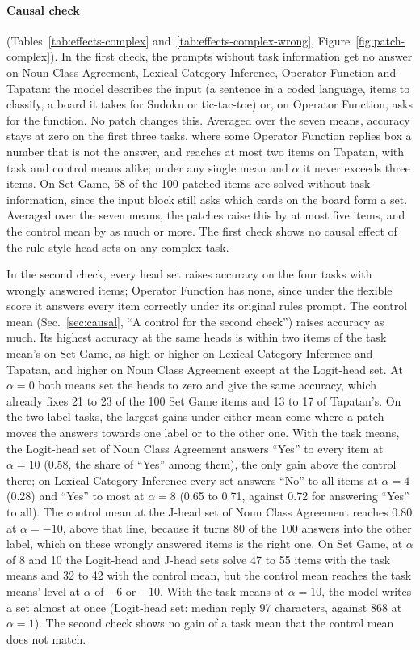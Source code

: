 \documentclass[11pt,a4paper]{article}
\begin{document}
\paragraph{Causal check} (Tables~\ref{tab:effects-complex} and~\ref{tab:effects-complex-wrong}, Figure~\ref{fig:patch-complex}). In the first check, the prompts without task information get no answer on Noun Class Agreement, Lexical Category Inference, Operator Function and Tapatan: the model describes the input (a sentence in a coded language, items to classify, a board it takes for Sudoku or tic-tac-toe) or, on Operator Function, asks for the function. No patch changes this. Averaged over the seven means, accuracy stays at zero on the first three tasks, where some Operator Function replies box a number that is not the answer, and reaches at most two items on Tapatan, with task and control means alike; under any single mean and $\alpha$ it never exceeds three items. On Set Game, 58 of the 100 patched items are solved without task information, since the input block still asks which cards on the board form a set. Averaged over the seven means, the patches raise this by at most five items, and the control mean by as much or more. The first check shows no causal effect of the rule-style head sets on any complex task.

In the second check, every head set raises accuracy on the four tasks with wrongly answered items; Operator Function has none, since under the flexible score it answers every item correctly under its original rules prompt. The control mean (Sec.~\ref{sec:causal}, ``A control for the second check'') raises accuracy as much. Its highest accuracy at the same heads is within two items of the task mean's on Set Game, as high or higher on Lexical Category Inference and Tapatan, and higher on Noun Class Agreement except at the Logit-head set. At $\alpha=0$ both means set the heads to zero and give the same accuracy, which already fixes 21 to 23 of the 100 Set Game items and 13 to 17 of Tapatan's. On the two-label tasks, the largest gains under either mean come where a patch moves the answers towards one label or to the other one. With the task means, the Logit-head set of Noun Class Agreement answers ``Yes'' to every item at $\alpha=10$ (0.58, the share of ``Yes'' among them), the only gain above the control there; on Lexical Category Inference every set answers ``No'' to all items at $\alpha=4$ (0.28) and ``Yes'' to most at $\alpha=8$ (0.65 to 0.71, against 0.72 for answering ``Yes'' to all). The control mean at the J-head set of Noun Class Agreement reaches 0.80 at $\alpha=-10$, above that line, because it turns 80 of the 100 answers into the other label, which on these wrongly answered items is the right one. On Set Game, at $\alpha$ of 8 and 10 the Logit-head and J-head sets solve 47 to 55 items with the task means and 32 to 42 with the control mean, but the control mean reaches the task means' level at $\alpha$ of $-6$ or $-10$. With the task means at $\alpha=10$, the model writes a set almost at once (Logit-head set: median reply 97 characters, against 868 at $\alpha=1$). The second check shows no gain of a task mean that the control mean does not match.
\end{document}
